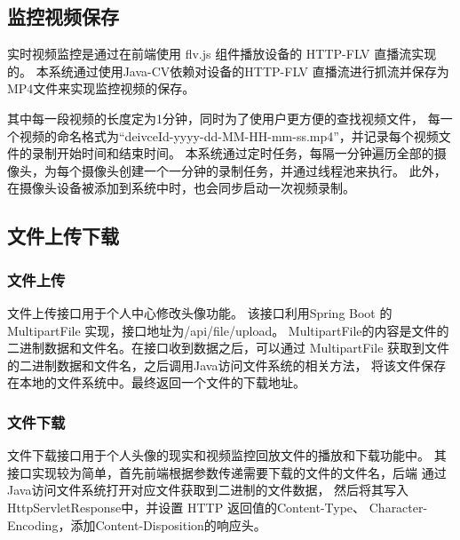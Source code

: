 \subsection{监控视频保存}
实时视频监控是通过在前端使用 flv.js 组件播放设备的 HTTP-FLV 直播流实现的。
本系统通过使用Java-CV依赖对设备的HTTP-FLV 直播流进行抓流并保存为MP4文件来实现监控视频的保存。

其中每一段视频的长度定为1分钟，同时为了使用户更方便的查找视频文件，
每一个视频的命名格式为“deivceId-yyyy-dd-MM-HH-mm-ss.mp4”，并记录每个视频文件的录制开始时间和结束时间。
本系统通过定时任务，每隔一分钟遍历全部的摄像头，为每个摄像头创建一个一分钟的录制任务，并通过线程池来执行。
此外，在摄像头设备被添加到系统中时，也会同步启动一次视频录制。

\subsection{文件上传下载}
\subsubsection{文件上传}
文件上传接口用于个人中心修改头像功能。
该接口利用Spring Boot 的 MultipartFile 实现，接口地址为/api/file/upload。
MultipartFile的内容是文件的二进制数据和文件名。在接口收到数据之后，可以通过 
MultipartFile 获取到文件的二进制数据和文件名，之后调用Java访问文件系统的相关方法，
将该文件保存在本地的文件系统中。最终返回一个文件的下载地址。




\subsubsection{文件下载}
文件下载接口用于个人头像的现实和视频监控回放文件的播放和下载功能中。
其接口实现较为简单，首先前端根据参数传递需要下载的文件的文件名，后端
通过Java访问文件系统打开对应文件获取到二进制的文件数据，
然后将其写入HttpServletResponse中，并设置 HTTP 返回值的Content-Type、
Character-Encoding，添加Content-Disposition的响应头。

